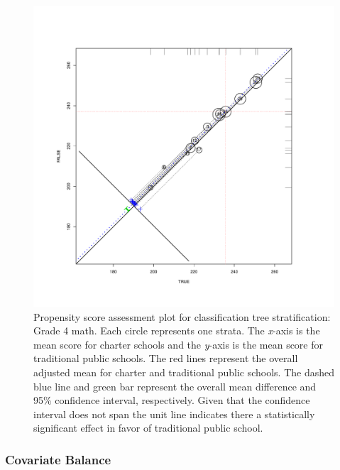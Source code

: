 \documentclass[letterpaper,12p,twoside]{article} %
\begin{document}
\setlength{\belowcaptionskip}{-10pt}
\begin{figure}[t!]
\begin{center}
\includegraphics[width=\textwidth,trim=0 .7in 0 .7in]{../Figures2009/g4math-circpsa-tree.pdf}
\caption[Propensity score assessment plot for classification tree stratification: Grade 4 math]{Propensity score assessment plot for classification tree stratification: Grade 4 math. Each circle represents one strata. The \textit{x}-axis is the mean score for charter schools and the \textit{y}-axis is the mean score for traditional public schools. The red lines represent the overall adjusted mean for charter and traditional public schools. The dashed blue line and green bar represent the overall mean difference and 95\% confidence interval, respectively. Given that the confidence interval does not span the unit line indicates there a statistically significant effect in favor of traditional public school.}
\label{fig:g4math:circpsa:tree}
\end{center}
\end{figure}
\setlength{\belowcaptionskip}{0pt}

\subsubsection{Covariate Balance}
\end{document}
